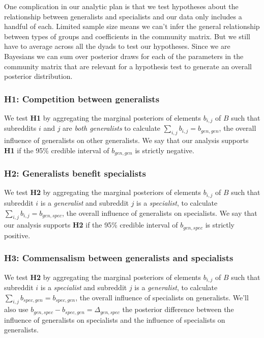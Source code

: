 \documentclass[12pt]{memoir}
\begin{document}
One complication in our analytic plan is that we test hypotheses about the relationship between generalists and specialists and our data only includes a handful of each.  Limited sample size means we can't infer the general relationship between types of groups and coefficients in the community matrix.  But we still have to average across all the dyads to test our hypotheses. Since we are Bayesians we can sum over posterior draws for each of the parameters in the community matrix that are relevant for a hypothesis test to generate an overall posterior distribution.

\subsubsection{\textbf{H1:} Competition between generalists}

We test \textbf{H1} by aggregating the marginal posteriors of elements $b_{i,j}$ of $B$ such that subreddits $i$ and $j$ are \emph{both generalists} to calculate $\sum_{i,j}{b_{i,j}}=b_{gen,gen}$, the overall influence of generalists on other generalists. We say that our analysis supports \textbf{H1} if the 95\% credible interval of $b_{gen,gen}$ is strictly negative.


\subsubsection{\textbf{H2:} Generalists benefit specialists}

We test \textbf{H2} by aggregating the marginal posteriors of elements $b_{i,j}$ of $B$ such that subreddit $i$ is a \emph{generalist} and subreddit $j$  is a \emph{specialist}, to calculate $\sum_{i,j}{b_{i,j}} = b_{gen,spec}$, the overall influence of generalists on specialists. We say that our analysis supports \textbf{H2} if the 95\% credible interval of $b_{gen,spec}$ is strictly positive.


\subsubsection{\textbf{H3:} Commensalism between generalists and specialists}

We test \textbf{H2} by aggregating the marginal posteriors of elements $b_{i,j}$ of $B$ such that subreddit $i$ is a \emph{specialist} and subreddit $j$  is a \emph{generalist}, to calculate $\sum_{i,j}{b_{spec,gen}}= b_{spec,gen}$, the overall influence of specialists on generalists.  We'll also use $b_{gen,spec} - b_{spec,gen} = \Delta_{gen,spec}$ the posterior difference between the influence of generalists on specialists and the influence of specialists on generalists. 
\end{document}
